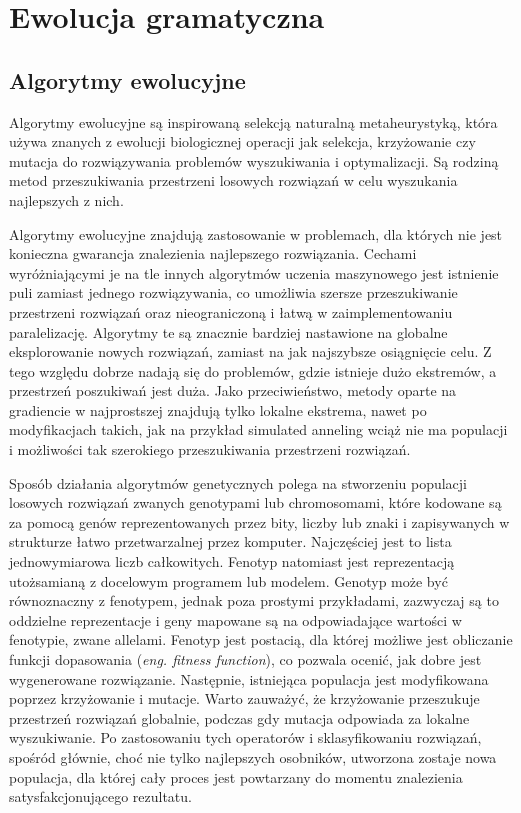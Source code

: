 
\section{Ewolucja gramatyczna}
\label{sec:ewolucjaGramatyczna}
\subsection{Algorytmy ewolucyjne}
Algorytmy ewolucyjne \cite{EA} są inspirowaną selekcją naturalną metaheurystyką, która używa znanych z ewolucji biologicznej operacji jak selekcja, krzyżowanie czy mutacja do rozwiązywania problemów wyszukiwania i optymalizacji. Są rodziną metod przeszukiwania przestrzeni losowych rozwiązań w celu wyszukania najlepszych z nich. 

Algorytmy ewolucyjne znajdują zastosowanie w problemach, dla których nie jest konieczna gwarancja znalezienia najlepszego rozwiązania. Cechami wyróżniającymi je na tle innych algorytmów uczenia maszynowego jest istnienie puli zamiast jednego rozwiązywania, co umożliwia szersze przeszukiwanie przestrzeni rozwiązań oraz nieograniczoną i łatwą w zaimplementowaniu paralelizację. Algorytmy te są znacznie bardziej nastawione na globalne eksplorowanie nowych rozwiązań, zamiast na jak najszybsze osiągnięcie celu. Z tego względu dobrze nadają się do problemów, gdzie istnieje dużo ekstremów, a przestrzeń poszukiwań jest duża. Jako przeciwieństwo, metody oparte na gradiencie w najprostszej znajdują tylko lokalne ekstrema, nawet po modyfikacjach takich, jak na przykład simulated anneling wciąż nie ma populacji i możliwości tak szerokiego przeszukiwania przestrzeni rozwiązań.

Sposób działania algorytmów genetycznych polega na stworzeniu populacji losowych rozwiązań zwanych genotypami lub chromosomami, które kodowane są za pomocą genów reprezentowanych przez bity, liczby lub znaki i zapisywanych w strukturze łatwo przetwarzalnej przez komputer. Najczęściej jest to lista jednowymiarowa liczb całkowitych. Fenotyp natomiast jest reprezentacją utożsamianą z docelowym programem lub modelem. Genotyp może być równoznaczny z fenotypem, jednak poza prostymi przykładami, zazwyczaj są to oddzielne reprezentacje i geny mapowane są na odpowiadające wartości w fenotypie, zwane allelami. Fenotyp jest postacią, dla której możliwe jest obliczanie funkcji dopasowania (\textit{eng. fitness function}), co pozwala ocenić, jak dobre jest wygenerowane rozwiązanie. Następnie, istniejąca populacja jest modyfikowana poprzez krzyżowanie i mutacje. Warto zauważyć, że krzyżowanie przeszukuje przestrzeń rozwiązań globalnie, podczas gdy mutacja odpowiada za lokalne wyszukiwanie. Po zastosowaniu tych operatorów i sklasyfikowaniu rozwiązań, spośród głównie, choć nie tylko najlepszych osobników, utworzona zostaje nowa populacja, dla której cały proces jest powtarzany do momentu znalezienia satysfakcjonującego rezultatu.

